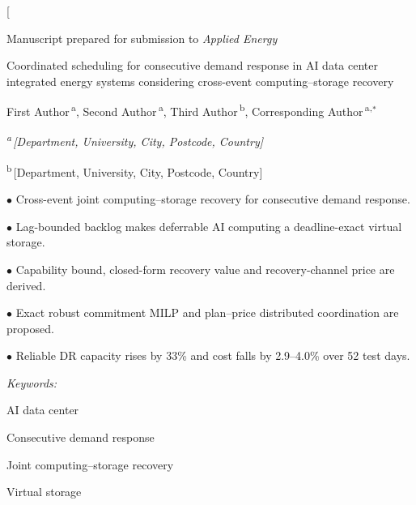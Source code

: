 \documentclass[9pt,twocolumn]{extarticle}
\newcommand{\PaperTitle}{Coordinated scheduling for consecutive demand response in AI data center integrated energy systems considering cross-event computing--storage recovery}
\newcommand{\PaperAuthors}{First Author\,\textsuperscript{a}, Second Author\,\textsuperscript{a}, Third Author\,\textsuperscript{b}, Corresponding Author\,\textsuperscript{a,}$^{*}$}
\newcommand{\PaperAffiliations}{%
  \textsuperscript{a}\,[Department, University, City, Postcode, Country]\par
  \textsuperscript{b}\,[Department, University, City, Postcode, Country]}
\begin{document}
\thispagestyle{firstpage}
\twocolumn[{%
\begin{center}
{\fontsize{7.5}{9}\selectfont\color{aeblue} Manuscript prepared for submission to \textit{Applied Energy}}
\end{center}
\vspace{-1mm}
\aethickrule
\vspace{7mm}
{\raggedright\fontsize{15.5}{19}\selectfont \PaperTitle\par}
\vspace{4.5mm}
{\raggedright\fontsize{9.6}{12}\selectfont \PaperAuthors\par}
\vspace{2.5mm}
{\raggedright\fontsize{6.6}{8.4}\selectfont\itshape \PaperAffiliations\par}
\vspace{4mm}
\aethinrule
\vspace{3.2mm}
\par
\vspace{1.6mm}
\aethinrule
\vspace{0.6mm}
{\fontsize{7.6}{9.6}\selectfont
\noindent$\bullet$ Cross-event joint computing--storage recovery for consecutive demand response.\par
\noindent$\bullet$ Lag-bounded backlog makes deferrable AI computing a deadline-exact virtual storage.\par
\noindent$\bullet$ Capability bound, closed-form recovery value and recovery-channel price are derived.\par
\noindent$\bullet$ Exact robust commitment MILP and plan--price distributed coordination are proposed.\par
\noindent$\bullet$ Reliable DR capacity rises by 33\% and cost falls by 2.9--4.0\% over 52 test days.\par}
\vspace{1.2mm}
\aethinrule
\vspace{5mm}
\noindent
\begin{minipage}[t]{0.245\textwidth}
\par\vspace{1.6mm}\aethinrule\vspace{1.2mm}
{\fontsize{6.8}{8.6}\selectfont\raggedright
\textit{Keywords:}\par
AI data center\par
Consecutive demand response\par
Joint computing--storage recovery\par
Virtual storage\par
}
\end{minipage}}
\end{document}
